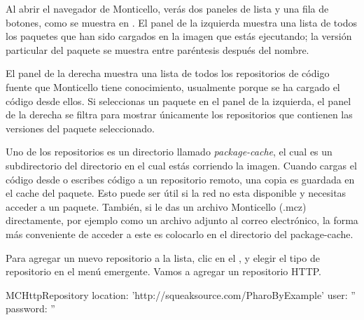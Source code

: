\documentclass[spanish,a4paper,10pt,twoside]{book}
\begin{document}
Al abrir el navegador de Monticello, ver\'as dos paneles de lista y una fila de botones, como se muestra en .
El panel de la izquierda muestra una lista de todos los paquetes que han sido cargados en la imagen que est\'as ejecutando; la versi\'on particular del paquete se muestra entre par\'entesis despu\'es del nombre.

El panel de la derecha muestra una lista de todos los repositorios de c\'odigo fuente que Monticello tiene conocimiento, usualmente porque se ha cargado el c\'odigo desde ellos.  Si seleccionas un paquete en el panel de la izquierda, el panel de la derecha se filtra para mostrar \'unicamente los repositorios que contienen las versiones del paquete seleccionado.

Uno de los repositorios es un directorio llamado \emph{package-cache}, el cual es un subdirectorio del directorio en el cual est\'as corriendo la imagen.
Cuando cargas el c\'odigo desde o escribes c\'odigo a un repositorio remoto, una copia es guardada en el cache del paquete. Esto puede ser \'util si la red no esta disponible y necesitas acceder a un paquete.  Tambi\'en, si le das un archivo Monticello (.mcz) directamente, por ejemplo como un archivo adjunto al correo electr\'onico, la forma m\'as conveniente de acceder a este es colocarlo en el directorio del package-cache.

Para agregar un nuevo repositorio a la lista, clic en el , y elegir el tipo de repositorio en el men\'u emergente.  Vamos a agregar un repositorio HTTP.

\begin{code}{}
MCHttpRepository
	location: 'http://squeaksource.com/PharoByExample'
	user: ''
	password: ''
\end{code}
\end{document}
